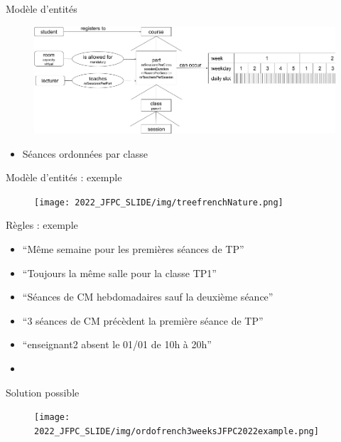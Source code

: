 \documentclass{beamer}
\begin{document}
\begin{frame}{Modèle d'entités}
\begin{itemize}
    \end{itemize}
    \begin{figure}
        \centering
        \includegraphics[scale = 0.33]{img/utp_entity_model.png}
        \label{fig:entities}
    \end{figure}
    \begin{itemize}
        \item Séances ordonnées par classe
    \end{itemize}
\end{frame}

\begin{frame}{Modèle d'entités : exemple}
        \begin{figure}
        \centering
        \texttt{[image: 2022\_JFPC\_SLIDE/img/treefrenchNature.png]}
        \label{fig:my_tree_rule}
    \end{figure}
\end{frame}
 \begin{frame}[t]{Règles : exemple}
 \begin{itemize}
     \item ``Même semaine pour les premières séances de TP''
     \item ``Toujours la même salle pour la classe TP1''
     \item ``Séances de CM hebdomadaires sauf la deuxième séance''
     \item ``3 séances de CM précèdent la première séance de TP''
     \item ``enseignant2 absent le 01/01 de 10h à 20h''
     \item[]
 \end{itemize}
 Solution possible
  \begin{figure}
        \centering
        \texttt{[image: 2022\_JFPC\_SLIDE/img/ordofrench3weeksJFPC2022example.png]}
    \end{figure}
 \end{frame}
\end{document}
